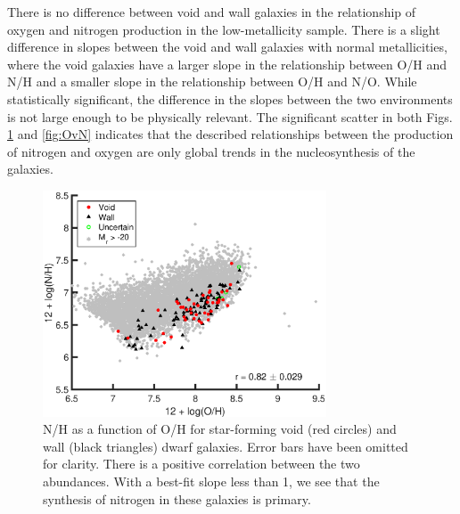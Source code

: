 There is no difference between void and wall galaxies in the relationship of 
oxygen and nitrogen production in the low-metallicity sample.  There is a slight 
difference in slopes between the void and wall galaxies with normal 
metallicities, where the void galaxies have a larger slope in the relationship 
between O/H and N/H and a smaller slope in the relationship between O/H and N/O.  
While statistically significant, the difference in the slopes between the two 
environments is not large enough to be physically relevant.  The significant 
scatter in both Figs. \ref{fig:OHvNH} and \ref{fig:OvN} indicates that the 
described relationships between the production of nitrogen and oxygen are only 
global trends in the nucleosynthesis of the galaxies.

\begin{figure}
    \centering
    \includegraphics[width=0.75\textwidth]{Images/Paper2/1sig_I06_dwarf_0-20_SF_t3_Z12logOH_N12logNH}
    \caption[N/H versus metallicity for 135 dwarf galaxy sample]{N/H as a 
    function of O/H for star-forming void (red circles) and wall (black 
    triangles) dwarf galaxies.  Error bars have been omitted for clarity.  There 
    is a positive correlation between the two abundances.  With a best-fit slope 
    less than 1, we see that the synthesis of nitrogen in these galaxies is 
    primary.}
    \label{fig:OHvNH}
\end{figure}



